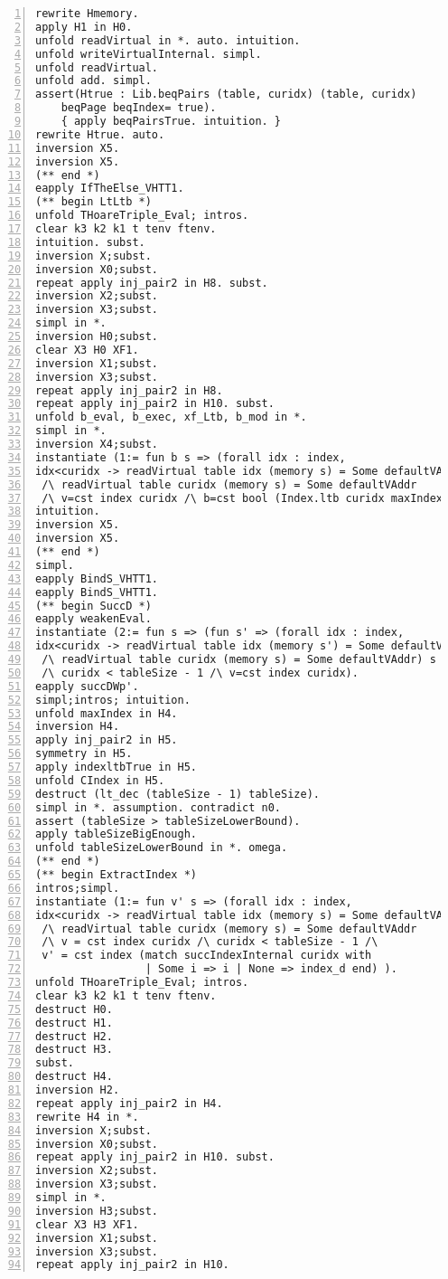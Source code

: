 \begin{appendices}
\begin{lstlisting}[xleftmargin=-.1\textwidth,
xrightmargin=-.1\textwidth,
mathescape=true,numbers=left]
rewrite Hmemory.
apply H1 in H0.
unfold readVirtual in *. auto. intuition.
unfold writeVirtualInternal. simpl.
unfold readVirtual.
unfold add. simpl.
assert(Htrue : Lib.beqPairs (table, curidx) (table, curidx) 
	beqPage beqIndex= true).
    { apply beqPairsTrue. intuition. }
rewrite Htrue. auto.
inversion X5.
inversion X5.
(** end *)
eapply IfTheElse_VHTT1.
(** begin LtLtb *)
unfold THoareTriple_Eval; intros.
clear k3 k2 k1 t tenv ftenv.
intuition. subst.
inversion X;subst.
inversion X0;subst.
repeat apply inj_pair2 in H8. subst.
inversion X2;subst.
inversion X3;subst.
simpl in *.
inversion H0;subst.
clear X3 H0 XF1.
inversion X1;subst.
inversion X3;subst.
repeat apply inj_pair2 in H8.
repeat apply inj_pair2 in H10. subst.
unfold b_eval, b_exec, xf_Ltb, b_mod in *.
simpl in *.
inversion X4;subst.
instantiate (1:= fun b s => (forall idx : index,
idx<curidx -> readVirtual table idx (memory s) = Some defaultVAddr)
 /\ readVirtual table curidx (memory s) = Some defaultVAddr 
 /\ v=cst index curidx /\ b=cst bool (Index.ltb curidx maxIndex)).
intuition.
inversion X5.
inversion X5.
(** end *)
simpl.
eapply BindS_VHTT1.
eapply BindS_VHTT1.
(** begin SuccD *)
eapply weakenEval.
instantiate (2:= fun s => (fun s' => (forall idx : index,
idx<curidx -> readVirtual table idx (memory s') = Some defaultVAddr) 
 /\ readVirtual table curidx (memory s) = Some defaultVAddr) s 
 /\ curidx < tableSize - 1 /\ v=cst index curidx).
eapply succDWp'.
simpl;intros; intuition.
unfold maxIndex in H4.
inversion H4.
apply inj_pair2 in H5.
symmetry in H5.
apply indexltbTrue in H5.
unfold CIndex in H5.
destruct (lt_dec (tableSize - 1) tableSize). 
simpl in *. assumption. contradict n0.
assert (tableSize > tableSizeLowerBound).
apply tableSizeBigEnough.
unfold tableSizeLowerBound in *. omega.
(** end *) 
(** begin ExtractIndex *)
intros;simpl.
instantiate (1:= fun v' s => (forall idx : index,
idx<curidx -> readVirtual table idx (memory s) = Some defaultVAddr) 
 /\ readVirtual table curidx (memory s) = Some defaultVAddr 
 /\ v = cst index curidx /\ curidx < tableSize - 1 /\
 v' = cst index (match succIndexInternal curidx with 
                 | Some i => i | None => index_d end) ).
unfold THoareTriple_Eval; intros.
clear k3 k2 k1 t tenv ftenv.
destruct H0.
destruct H1.
destruct H2.
destruct H3.
subst.
destruct H4.
inversion H2.
repeat apply inj_pair2 in H4.
rewrite H4 in *.
inversion X;subst.
inversion X0;subst.
repeat apply inj_pair2 in H10. subst.
inversion X2;subst.
inversion X3;subst.
simpl in *.
inversion H3;subst.
clear X3 H3 XF1.
inversion X1;subst.
inversion X3;subst.
repeat apply inj_pair2 in H10.

\end{lstlisting}
\end{appendices}
